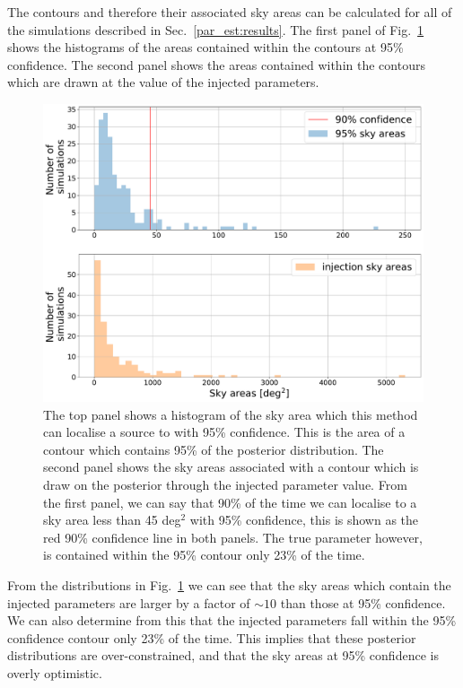 The contours and therefore their associated sky areas can be calculated for all
of the simulations described in Sec.~\ref{par_est:results}. The first panel of Fig.~\ref{par_est:results:sky_area} shows the histograms of the areas contained within the contours at 95\% confidence. The second panel shows the areas contained within the contours which are drawn at the value of the injected parameters.
%
\begin{figure}[ht]
    \centering
    \includegraphics[width=\linewidth]{C5_parameter/sky_area_hist.pdf}
    \caption[histogram showing the area contained within 90\% confidence contours]{
    	The top panel shows a histogram of the sky area which this method can localise a source to with 95\% confidence. This is the area of a contour which contains 95\% of the posterior distribution.
    	The second panel shows the sky areas associated with a contour which is draw on the posterior through the injected parameter value. 
    	From the first panel, we can say that 90\% of the time we can localise to a sky area less than 45 deg$^2$ with 95\% confidence, this is shown as the red 90\% confidence line in both panels.
    	The true parameter however, is contained within the 95\% contour only 23\% of the time.}
\label{par_est:results:sky_area} 
\end{figure}
%
From the distributions in Fig.~\ref{par_est:results:sky_area} we can see that
the sky areas which contain the injected parameters are larger by a factor of
$\sim 10$ than those at 95\% confidence.  We can also determine from this that the injected
parameters fall within the 95\% confidence contour only 23\% of the time.  This
implies that these posterior distributions are over-constrained, and that the sky areas at 95\% confidence is overly optimistic.

